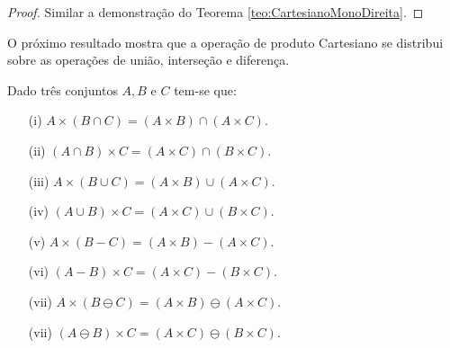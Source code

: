 \begin{proof}
	Similar a demonstração do Teorema \ref{teo:CartesianoMonoDireita}.
\end{proof}

O próximo resultado mostra que a operação de produto Cartesiano se distribui sobre as operações de união, interseção e diferença.

\begin{theorem}\label{teo:DistributividadeCartesiano}
	Dado três conjuntos $A, B$ e $C$ tem-se que:
	\begin{itemize}
		\item[(i)] $A \times (B \cap C) = (A \times B) \cap (A \times C)$.
		\item[(ii)] $(A \cap B) \times C = (A \times C) \cap (B \times C)$.
		\item[(iii)] $A \times (B \cup C) = (A \times B) \cup (A \times C)$.
		\item[(iv)] $(A \cup B) \times C = (A \times C) \cup (B \times C)$.
		\item[(v)] $A \times (B - C) = (A \times B) - (A \times C)$.
		\item[(vi)] $(A - B) \times C = (A \times C) - (B \times C)$.
		\item[(vii)] $A \times (B \ominus C) = (A \times B) \ominus (A \times C)$.
		\item[(vii)] $(A \ominus B) \times C = (A \times C) \ominus (B \times C)$.
	\end{itemize}
\end{theorem}

